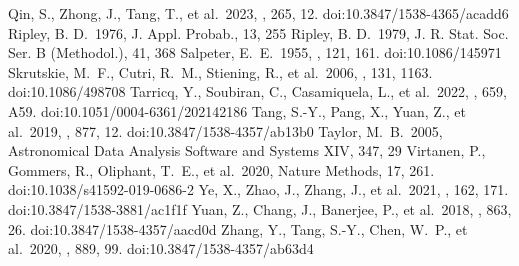 \documentclass{aa} %
\begin{document}
\begin{thebibliography}{}
     Qin, S., Zhong, J., Tang, T., et al.\ 2023, \apjs, 265, 12. doi:10.3847/1538-4365/acadd6
     Ripley, B. D.\ 1976, J. Appl. Probab., 13, 255
     Ripley, B. D.\ 1979, J. R. Stat. Soc. Ser. B (Methodol.), 41, 368
     Salpeter, E.~E.\ 1955, \apj, 121, 161. doi:10.1086/145971
     Skrutskie, M.~F., Cutri, R.~M., Stiening, R., et al.\ 2006, \aj, 131, 1163. doi:10.1086/498708
     Tarricq, Y., Soubiran, C., Casamiquela, L., et al.\ 2022, \aap, 659, A59. doi:10.1051/0004-6361/202142186
     Tang, S.-Y., Pang, X., Yuan, Z., et al.\ 2019, \apj, 877, 12. doi:10.3847/1538-4357/ab13b0
     Taylor, M.~B.\ 2005, Astronomical Data Analysis Software and Systems XIV, 347, 29
     Virtanen, P., Gommers, R., Oliphant, T.~E., et al.\ 2020, Nature Methods, 17, 261. doi:10.1038/s41592-019-0686-2
     Ye, X., Zhao, J., Zhang, J., et al.\ 2021, \aj, 162, 171. doi:10.3847/1538-3881/ac1f1f
     Yuan, Z., Chang, J., Banerjee, P., et al.\ 2018, \apj, 863, 26. doi:10.3847/1538-4357/aacd0d
     Zhang, Y., Tang, S.-Y., Chen, W.~P., et al.\ 2020, \apj, 889, 99. doi:10.3847/1538-4357/ab63d4

\end{thebibliography}
%
%
\end{document}
